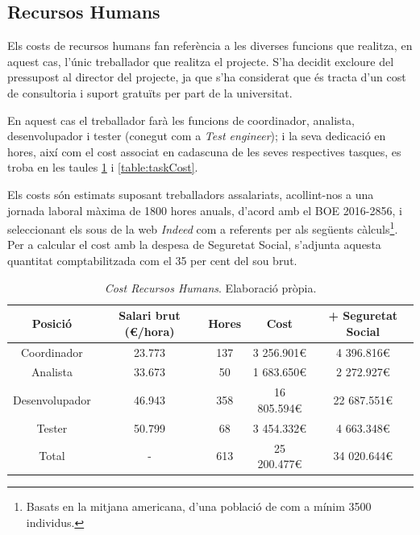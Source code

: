 \documentclass[a4paper]{article} %
\begin{document}
	\subsection{Recursos Humans}
	Els costs de recursos humans fan referència a les diverses funcions que realitza, en aquest cas, l'únic treballador que realitza el projecte. S'ha decidit excloure del pressupost al director del projecte, ja que s'ha considerat que és tracta d'un cost de consultoria i suport gratuïts per part de la universitat.
	\par 
	En aquest cas el treballador farà les funcions de coordinador, analista, desenvolupador i tester (conegut com a \textit{Test engineer}); i la seva dedicació en hores, així com el cost associat  en cadascuna de les seves respectives tasques, es troba en les taules \ref{table:humansCost} i \ref{table:taskCost}. \par
	Els costs són estimats suposant treballadors assalariats, acollint-nos a una jornada laboral màxima de 1800 hores anuals, d'acord amb el BOE 2016-2856\cite{boe}, i seleccionant els sous de la web \textit{Indeed}\cite{indeed} com a referents per als següents càlculs\footnote{Basats en la mitjana americana, d'una població de com a mínim 3500 individus.}. Per a calcular el cost amb la despesa de Seguretat Social, s'adjunta aquesta quantitat comptabilitzada com el 35 per cent del sou brut.
	\begin{table}[h!]
		\centering
		\hspace*{-1cm}
		\begin{tabular}{|| c || c | c | c | c ||}
			\hline
			\textbf{Posició} & \textbf{Salari brut (\euro/hora)} & \textbf{Hores} & \textbf{Cost} & \textbf{+ Seguretat Social}\\
			\hline \hline
			Coordinador	& 23.773	& 137	& 3 256.901\euro	& 4 396.816\euro \\
			Analista	& 33.673	& 50	& 1 683.650\euro	& 2 272.927\euro \\
			Desenvolupador &	46.943 & 358	& 16 805.594\euro	& 22 687.551\euro \\
			Tester 		&	50.799 & 68 & 3 454.332\euro	& 4 663.348\euro \\			
			\hline \hline 
			Total & - & 613 & 25 200.477\euro & 34 020.644\euro \\ 
			\hline
		\end{tabular}
		\caption[\textit{Cost RRHH}]{\textit{\small Cost Recursos Humans}. Elaboració pròpia.}
		\label{table:humansCost}
	\end{table}
\end{document}
